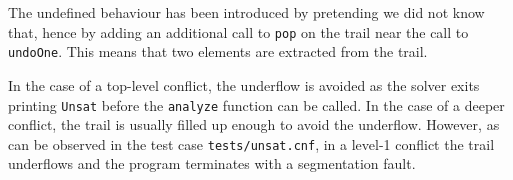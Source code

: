 The undefined behaviour has been introduced by pretending we did not know that, hence by adding an additional call to \texttt{pop} on the trail near the call to \texttt{undoOne}. This means that two elements are extracted from the trail.

In the case of a top-level conflict, the underflow is avoided as the solver exits printing \texttt{Unsat} before the \texttt{analyze} function can be called. In the case of a deeper conflict, the trail is usually filled up enough to avoid the underflow. However, as can be observed in the test case \texttt{tests/unsat.cnf}, in a level-1 conflict the trail underflows and the program terminates with a segmentation fault. 
    

